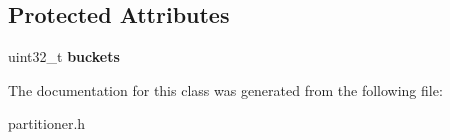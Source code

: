 \subsection*{Protected Attributes}
\begin{DoxyCompactItemize}
\item 
\hypertarget{classPartitionMonitor_a99908dc1baef7cdfd0b7c1d9f8a9ff47}{uint32\-\_\-t {\bfseries buckets}}\label{classPartitionMonitor_a99908dc1baef7cdfd0b7c1d9f8a9ff47}

\end{DoxyCompactItemize}


The documentation for this class was generated from the following file\-:\begin{DoxyCompactItemize}
\item 
partitioner.\-h\end{DoxyCompactItemize}
